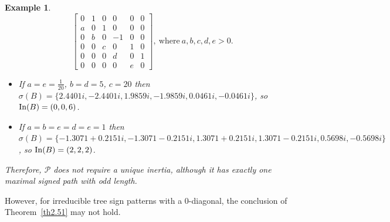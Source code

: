 \documentclass[a4paper, 10pt]{article}
\newtheorem{eg}{Example}[section]
\numberwithin{equation}{section}
\def\In{{\rm In}}
\begin{document}
\begin{eg}
	$$\begin{bmatrix}
		0&1&0&0&0&0\\ a&0&1&0&0&0\\ 0&b&0&-1&0&0\\ 0&0&c&0&1&0\\0&0&0&d&0&1\\0&0&0&0&e&0
	\end{bmatrix}, ~\text{where}~ a,b,c,d,e>0.$$
	\begin{itemize}
		\item[i.] If $a=e=\frac{1}{20}$, $b=d=5$, $c=20$ then $\sigma(B)=\{ 2.4401i, - 2.4401i, 1.9859i,- 1.9859i, 0.0461i, - 0.0461i\}$, so $\In(B)=(0,0,6)$.
		\item[ii.] If $a=b=e=d=e=1$ then $\sigma(B)=\{-1.3071 + 0.2151i, -1.3071 - 0.2151i, 1.3071 + 0.2151i, 1.3071 - 0.2151i, 0.5698i, - 0.5698i\}$, so $\In(B)=(2,2,2)$.
	\end{itemize}
	Therefore, $\mathcal{P}$ does not require a unique inertia, although it has exactly one maximal signed path with odd length.
\end{eg}

However, for irreducible tree sign patterns with a $0$-diagonal, the conclusion of Theorem~\ref{th2.51} may not hold.
\end{document}

